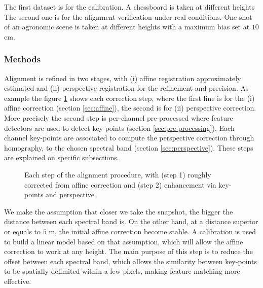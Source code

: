 \documentclass[../thesis.tex]{subfiles}
\begin{document}
	\par The first dataset is for the calibration. A chessboard is taken at different heights %
	The second one is for the alignment verification under real conditions.
	One shot of an agronomic scene is taken at different heights %
	with a maximum bias set at $10$ cm. %
	
	\subsubsection{Methods}
	
	Alignment is refined in two stages, with (i) affine registration approximately estimated and (ii) perspective registration for the refinement and precision.
	As example the figure \ref{fig:each-stages} shows each correction step, where the first line is for the
	(i) affine correction (section \ref{sec:affine}), the second is for (ii) perspective correction.
	More precisely the second step is per-channel pre-processed where feature detectors are used to detect key-points (section \ref{sec:pre-processing}).
	Each channel key-points are associated to compute the perspective correction through homography, to the chosen spectral band (section \ref{sec:perspective}).
	These steps are explained on specific subsections.
	
	\begin{figure}[H]
		\centering
		
		\caption{Each step of the alignment procedure, with (step 1) roughly corrected from affine correction and (step 2) enhancement via key-points and perspective}
		\label{fig:each-stages}
	\end{figure}

	
	\label{sec:affine}
	
	We make the assumption that closer we take the snapshot, the bigger the distance between each spectral band is. %
	On the other hand, at a distance superior or equals to $5$ m, the initial affine correction become stable. %
	A calibration is used to build a linear model based on that assumption, which will allow the affine correction to work at any height.
	The main purpose of this step is to reduce the offset between each spectral band,
	which allows the similarity between key-points to be spatially delimited within a few pixels, making feature matching more effective.
	
\end{document}
